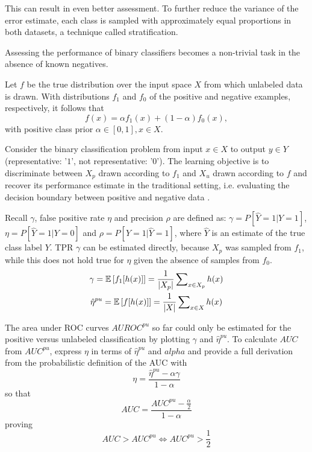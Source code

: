 This can result in even better assessment. To further reduce the variance of the error estimate, each class is sampled with approximately equal proportions in both datasets, a technique called stratiﬁcation. 

Assessing the performance of binary classifiers becomes a non-trivial task in the absence of known negatives.

Let \(f\) be the true distribution over the input space \(X\) from which unlabeled data is drawn. With distributions \(f_1\) and \(f_0\) of the positive and negative examples, respectively, it follows that \[f(x) = \alpha f_1(x) + (1-\alpha)f_0(x),\] with positive class prior \(\alpha \in [0,1], x \in X\).

Consider the binary classification problem from input \(x \in X\) to output \(y \in Y\) (representative: '\(1\)', not representative: '\(0\)'). The learning objective is to discriminate between \(X_p\) drawn according to \(f_1\) and \(X_u\) drawn according to \(f\)  and recover its performance estimate in the traditional setting, i.e. evaluating the decision boundary between positive and negative data \cite{jain}.

Recall \(\gamma\), false positive rate \(\eta\) and precision \(\rho\) are defined as: \(\gamma = P[\hat{Y} = 1| Y = 1]\), \(\eta = P[\hat{Y} = 1| Y = 0]\) and \(\rho = P[Y = 1| \hat{Y} = 1]\), where \(\hat{Y}\) is an estimate of the true class label \(Y\). TPR \(\gamma\) can be estimated directly, because \(X_p\) was sampled from \(f_1\), while this does not hold true for \(\eta\) given the absence of samples from \(f_0\). 
\begin{gather*}
\gamma = {\mathbb E}\left[ f_1[h(x)] \right] = \frac{1}{|X_p|} \sum\nolimits_{x \in X_p} h(x) \\
\hat{\eta}^{pu} = {\mathbb E}\left[ f[h(x)] \right] = \frac{1}{|X|} \sum\nolimits_{x \in X} h(x)
\end{gather*}

The area under ROC curves \(AUROC^{pu}\) so far could only be estimated for the positive versus unlabeled classification by plotting \(\gamma\) and \(\hat{\eta}^{pu}\). To calculate \(AUC\) from \(AUC^{pu}\), \cite{jain} express \(\eta\) in terms of \(\hat{\eta}^{pu}\) and \(alpha\) and provide a full derivation from the probabilistic definition of the AUC with
\[\eta = \frac{\hat{\eta}^{pu} - \alpha \gamma}{1 - \alpha}\] so that
\[AUC = \frac{AUC^{pu} - \frac{\alpha}{2}}{1 - \alpha}\] proving
\[AUC > AUC^{pu} \iff AUC^{pu} > \frac{1}{2}\]